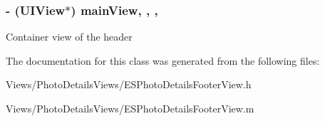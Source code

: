 \subsubsection[{main\+View}]{\setlength{\rightskip}{0pt plus 5cm}-\/ (U\+I\+View$\ast$) main\+View\hspace{0.3cm}{\ttfamily [read]}, {\ttfamily [write]}, {\ttfamily [nonatomic]}, {\ttfamily [strong]}}\label{interface_e_s_photo_details_footer_view_abd619c89f3b9b44e205cbffd054511e6}
Container view of the header 

The documentation for this class was generated from the following files\+:\begin{DoxyCompactItemize}
\item 
Views/\+Photo\+Details\+Views/E\+S\+Photo\+Details\+Footer\+View.\+h\item 
Views/\+Photo\+Details\+Views/E\+S\+Photo\+Details\+Footer\+View.\+m\end{DoxyCompactItemize}
